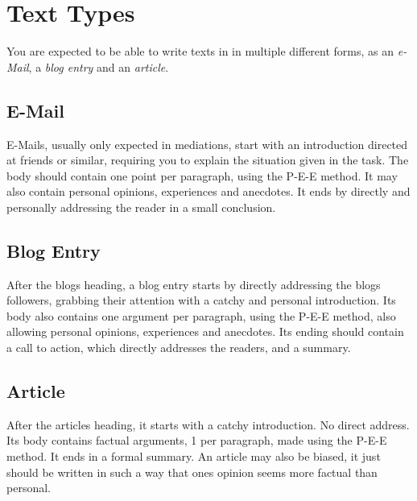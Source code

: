 \documentclass{article}
\begin{document}
\section{Text Types}
You are expected to be able to write texts in in multiple different forms, as an \emph{e-Mail}, a \emph{blog entry} and an \emph{article}.
 
\subsection{E-Mail}
E-Mails, usually only expected in mediations, start with an introduction directed at friends or similar, requiring you to explain the situation given in the task. The body should contain one point per paragraph, using the P-E-E method. It may also contain personal opinions, experiences and anecdotes. It ends by directly and personally addressing the reader in a small conclusion.
 
\subsection{Blog Entry}
After the blogs heading, a blog entry starts by directly addressing the blogs followers, grabbing their attention with a catchy and personal introduction. Its body also contains one argument per paragraph, using the P-E-E method, also allowing personal opinions, experiences and anecdotes. Its ending should contain a call to action, which directly addresses the readers, and a summary.
 
\subsection{Article}
After the articles heading, it starts with a catchy introduction. No direct address. Its body contains factual arguments, 1 per paragraph, made using the P-E-E method. It ends in a formal summary. An article may also be biased, it just should be written in such a way that ones opinion seems more factual than personal.
 
\end{document}
